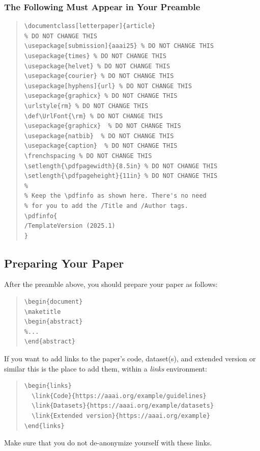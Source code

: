 \documentclass[letterpaper]{article} %
\def\UrlFont{\rm}  %
\begin{document}
\subsubsection{The Following Must Appear in Your Preamble}
\begin{quote}
\begin{scriptsize}\begin{verbatim}
\documentclass[letterpaper]{article}
% DO NOT CHANGE THIS
\usepackage[submission]{aaai25} % DO NOT CHANGE THIS
\usepackage{times} % DO NOT CHANGE THIS
\usepackage{helvet} % DO NOT CHANGE THIS
\usepackage{courier} % DO NOT CHANGE THIS
\usepackage[hyphens]{url} % DO NOT CHANGE THIS
\usepackage{graphicx} % DO NOT CHANGE THIS
\urlstyle{rm} % DO NOT CHANGE THIS
\def\UrlFont{\rm} % DO NOT CHANGE THIS
\usepackage{graphicx}  % DO NOT CHANGE THIS
\usepackage{natbib}  % DO NOT CHANGE THIS
\usepackage{caption}  % DO NOT CHANGE THIS
\frenchspacing % DO NOT CHANGE THIS
\setlength{\pdfpagewidth}{8.5in} % DO NOT CHANGE THIS
\setlength{\pdfpageheight}{11in} % DO NOT CHANGE THIS
%
% Keep the \pdfinfo as shown here. There's no need
% for you to add the /Title and /Author tags.
\pdfinfo{
/TemplateVersion (2025.1)
}
\end{verbatim}\end{scriptsize}
\end{quote}

\subsection{Preparing Your Paper}

After the preamble above, you should prepare your paper as follows:
\begin{quote}
\begin{scriptsize}\begin{verbatim}
\begin{document}
\maketitle
\begin{abstract}
%...
\end{abstract}\end{verbatim}\end{scriptsize}
\end{quote}

\noindent If you want to add links to the paper's code, dataset(s), and extended version or similar this is the place to add them, within a \emph{links} environment:
\begin{quote}%
\begin{scriptsize}\begin{verbatim}
\begin{links}
  \link{Code}{https://aaai.org/example/guidelines}
  \link{Datasets}{https://aaai.org/example/datasets}
  \link{Extended version}{https://aaai.org/example}
\end{links}\end{verbatim}\end{scriptsize}
\end{quote}
\noindent Make sure that you do not de-anonymize yourself with these links.
\end{document}
